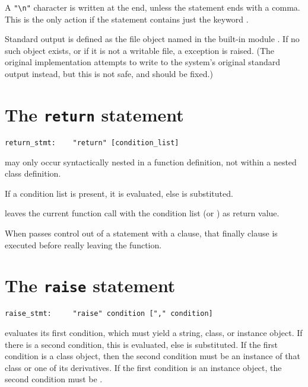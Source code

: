 A \verb/"\n"/ character is written at the end, unless the \verb@print@
statement ends with a comma.  This is the only action if the statement
contains just the keyword \verb@print@.

Standard output is defined as the file object named \verb@stdout@
in the built-in module \verb@sys@.  If no such object exists,
or if it is not a writable file, a \verb@RuntimeError@ exception is raised.
(The original implementation attempts to write to the system's original
standard output instead, but this is not safe, and should be fixed.)

\section{The {\tt return} statement}

\begin{verbatim}
return_stmt:    "return" [condition_list]
\end{verbatim}

\verb@return@ may only occur syntactically nested in a function
definition, not within a nested class definition.

If a condition list is present, it is evaluated, else \verb@None@
is substituted.

\verb@return@ leaves the current function call with the condition
list (or \verb@None@) as return value.

When \verb@return@ passes control out of a \verb@try@ statement
with a \verb@finally@ clause, that finally clause is executed
before really leaving the function.

\section{The {\tt raise} statement}

\begin{verbatim}
raise_stmt:     "raise" condition ["," condition]
\end{verbatim}

\verb@raise@ evaluates its first condition, which must yield
a string, class, or instance object.  If there is a second condition,
this is evaluated, else \verb@None@ is substituted.  If the first
condition is a class object, then the second condition must be an
instance of that class or one of its derivatives.  If the first
condition is an instance object, the second condition must be
\verb@None@.

